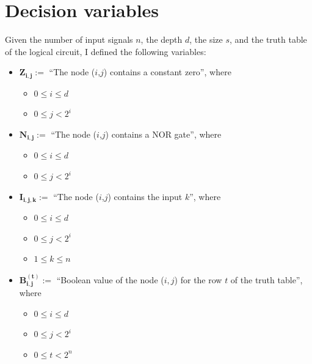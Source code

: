 \documentclass[letterpaper,10pt]{article}
\begin{document}
\section{Decision variables}
Given the number of input signals $n$, the depth $d$,  the size $s$, and the truth table of the logical circuit, I defined the following variables:
\begin{itemize}
    \item $\mathbf{Z_{i,j}}:=$ ``The node ($i$,$j$) contains a constant zero'', where
    \begin{itemize}
        \item $0 \leq i \leq d$
        \item $0 \leq j < 2^i$
    \end{itemize}
    \item $\mathbf{N_{i,j}}:=$ ``The node ($i$,$j$) contains a NOR gate'', where
    \begin{itemize}
        \item $0 \leq i \leq d$
        \item $0 \leq j < 2^i$
    \end{itemize}
    \item $\mathbf{I_{i,j,k}}:=$ ``The node ($i$,$j$) contains the input $k$'', where
    \begin{itemize}
        \item $0 \leq i \leq d$
        \item $0 \leq j < 2^i$
        \item $1 \leq k \leq n$
    \end{itemize}
    \item $\mathbf{B_{i,j}^{(t)}}:=$ ``Boolean value of the node ($i,j$) for the row $t$ of the truth table'', where
    \begin{itemize}
        \item $0 \leq i \leq d$
        \item $0 \leq j < 2^i$
        \item $0 \leq t < 2^n$
    \end{itemize}
\end{itemize}
\end{document}
